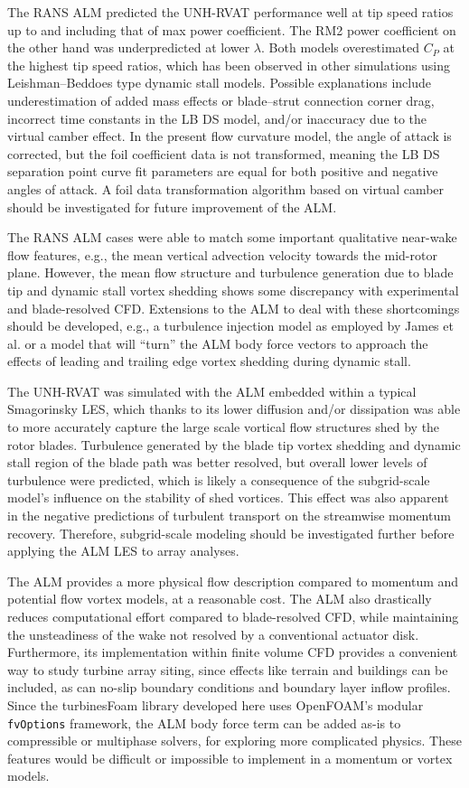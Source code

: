 \documentclass[times]{weauth}
\begin{document}
The RANS ALM predicted the UNH-RVAT performance well at tip speed ratios up to
and including that of max power coefficient. The RM2 power coefficient on the
other hand was underpredicted at lower $\lambda$. Both models overestimated
$C_P$ at the highest tip speed ratios, which has been observed in other
simulations using Leishman--Beddoes type dynamic stall models. Possible
explanations include underestimation of added mass effects or blade--strut
connection corner drag, incorrect time constants in the LB DS model, and/or
inaccuracy due to the virtual camber effect. In the present flow curvature
model, the angle of attack is corrected, but the foil coefficient data is not
transformed, meaning the LB DS separation point curve fit parameters are equal
for both positive and negative angles of attack. A foil data transformation
algorithm based on virtual camber should be investigated for future improvement
of the ALM.

The RANS ALM cases were able to match some important qualitative near-wake flow
features, e.g., the mean vertical advection velocity towards the mid-rotor
plane. However, the mean flow structure and turbulence generation due to blade
tip and dynamic stall vortex shedding shows some discrepancy with experimental
and blade-resolved CFD. Extensions to the ALM to deal with these shortcomings
should be developed, e.g., a turbulence injection model as employed by James et
al. \cite{James2010} or a model that will ``turn'' the ALM body force vectors to
approach the effects of leading and trailing edge vortex shedding during dynamic
stall.

The UNH-RVAT was simulated with the ALM embedded within a typical Smagorinsky
LES, which thanks to its lower diffusion and/or dissipation was able to more
accurately capture the large scale vortical flow structures shed by the rotor
blades. Turbulence generated by the blade tip vortex shedding and dynamic stall
region of the blade path was better resolved, but overall lower levels of
turbulence were predicted, which is likely a consequence of the subgrid-scale
model's influence on the stability of shed vortices. This effect was also
apparent in the negative predictions of turbulent transport on the streamwise
momentum recovery. Therefore, subgrid-scale modeling should be investigated
further before applying the ALM LES to array analyses.

The ALM provides a more physical flow description compared to momentum and
potential flow vortex models, at a reasonable cost. The ALM also drastically
reduces computational effort compared to blade-resolved CFD, while maintaining
the unsteadiness of the wake not resolved by a conventional actuator disk.
Furthermore, its implementation within finite volume CFD provides a convenient
way to study turbine array siting, since effects like terrain and buildings can
be included, as can no-slip boundary conditions and boundary layer inflow
profiles. Since the turbinesFoam library developed here uses OpenFOAM's modular
\texttt{fvOptions} framework, the ALM body force term can be added as-is to
compressible or multiphase solvers, for exploring more complicated physics.
These features would be difficult or impossible to implement in a momentum or
vortex models.
\end{document}

